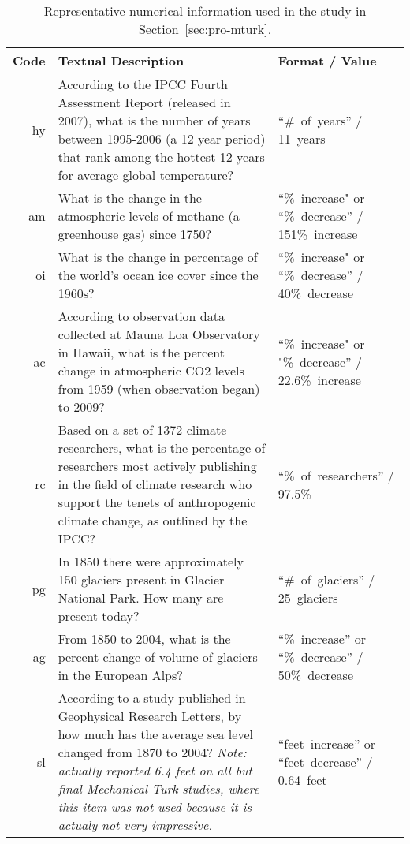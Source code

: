 \begin{table}
    \caption{Representative numerical information used in the study in
        Section~\ref{sec:pro-mturk}.}
    \label{table:pro-numbers1}
    \begin{tabu}{>{\sffamily}rX[3]X[-1,l]}
        \toprule
        Code & Textual Description & Format / Value \\
        \midrule
        hy &
According to the IPCC Fourth Assessment Report (released in 2007), what is the
number of years between 1995-2006 (a 12 year period) that rank among the hottest
12 years for average global temperature? &
“\#~of~years” / 11~years \\

am &
What is the change in the atmospheric levels of methane (a greenhouse gas) since
1750? &
“\%~increase" or “\%~decrease” /
151\%~increase \\

oi &
What is the change in percentage of the world's ocean ice cover since the 1960s?
&
“\%~increase" or “\%~decrease” /
40\%~decrease \\

ac &
According to observation data collected at Mauna Loa Observatory in Hawaii, what
is the percent change in atmospheric CO2 levels from 1959 (when observation
began) to 2009?	&
“\%~increase" or "\%~decrease” /
22.6\%~increase \\

rc &
Based on a set of 1372 climate researchers, what is the percentage of
researchers most actively publishing in the field of climate research who
support the tenets of anthropogenic climate change, as outlined by the IPCC? &
“\%~of~researchers” /
97.5\% \\

pg &
In 1850 there were approximately 150 glaciers present in Glacier National Park.
How many are present today?	&
“\#~of~glaciers” /
25~glaciers \\

ag &
From 1850 to 2004, what is the percent change of volume of glaciers in the
European Alps? &
“\%~increase” or “\%~decrease” /
50\%~decrease \\

sl &
According to a study published in Geophysical Research Letters, by how much has
the average sea level changed from 1870 to 2004?  \emph{Note: actually reported 6.4
feet on all but final Mechanical Turk studies, where this item was not used
because it is actualy not very impressive.} &
“feet~increase” or “feet~decrease” /
0.64~feet \\

    \bottomrule
    \end{tabu}
\end{table}

